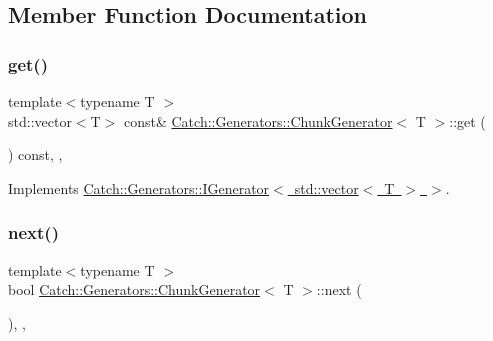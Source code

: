 \subsection{Member Function Documentation}
\mbox{\label{class_catch_1_1_generators_1_1_chunk_generator_aa41c7d08a165b6a18560f2ab9e977f0b}} 
\subsubsection{\texorpdfstring{get()}{get()}}
{\footnotesize\ttfamily template$<$typename T $>$ \\
std\+::vector$<$T$>$ const\& \mbox{\hyperlink{class_catch_1_1_generators_1_1_chunk_generator}{Catch\+::\+Generators\+::\+Chunk\+Generator}}$<$ T $>$\+::get (\begin{DoxyParamCaption}{ }\end{DoxyParamCaption}) const\hspace{0.3cm}{\ttfamily [inline]}, {\ttfamily [override]}, {\ttfamily [virtual]}}



Implements \mbox{\hyperlink{struct_catch_1_1_generators_1_1_i_generator_a525d381fc9249a885b075a0632a8579a}{Catch\+::\+Generators\+::\+I\+Generator$<$ std\+::vector$<$ T $>$ $>$}}.

\mbox{\label{class_catch_1_1_generators_1_1_chunk_generator_a545e89f80eb1e3c953491541ea083f86}} 
\subsubsection{\texorpdfstring{next()}{next()}}
{\footnotesize\ttfamily template$<$typename T $>$ \\
bool \mbox{\hyperlink{class_catch_1_1_generators_1_1_chunk_generator}{Catch\+::\+Generators\+::\+Chunk\+Generator}}$<$ T $>$\+::next (\begin{DoxyParamCaption}{ }\end{DoxyParamCaption})\hspace{0.3cm}{\ttfamily [inline]}, {\ttfamily [override]}, {\ttfamily [virtual]}}



